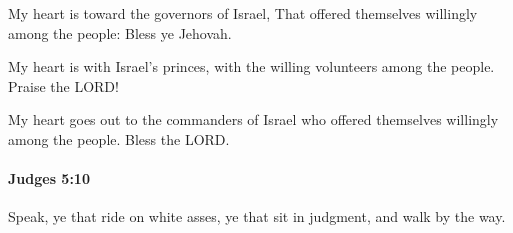 			\begin{versebox}
					\item[BHS] 
					\item[ASV] My heart is toward the governors of Israel, That offered themselves willingly among the people: Bless ye Jehovah.
					\item[NIV] My heart is with Israel’s princes, with the willing volunteers among the people. Praise the LORD!
					\item[NRSV] My heart goes out to the commanders of Israel who offered themselves willingly among the people. Bless the LORD.
			\end{versebox}

		\paragraph{Judges 5:10} %
			\label{JUDGES-5-10}

			Speak, ye that ride on white asses, ye that sit in judgment, and walk by the way.


